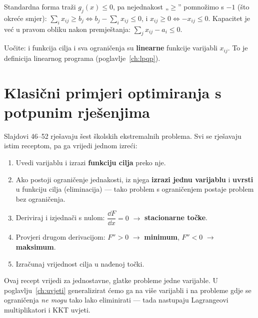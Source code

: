 \begin{napomena}
Standardna forma traži $g_j(x)\le 0$, pa nejednakost „$\ge$” pomnožimo s $-1$
(što okreće smjer): $\sum_i x_{ij} \ge b_j \Leftrightarrow
b_j - \sum_i x_{ij} \le 0$, i $x_{ij} \ge 0 \Leftrightarrow -x_{ij} \le 0$.
Kapacitet je već u pravom obliku nakon premještanja:
$\sum_j x_{ij} - a_i \le 0$.
\end{napomena}

Uočite: i funkcija cilja i sva ograničenja su \textbf{linearne} funkcije
varijabli $x_{ij}$. To je definicija linearnog programa
(poglavlje~\ref{ch:lpqp}).

\section{Klasični primjeri optimiranja s potpunim rješenjima}
\label{sec:klasicni-primjeri}

Slajdovi 46--52 rješavaju šest školskih ekstremalnih problema. Svi se rješavaju
istim receptom, pa ga vrijedi jednom izreći:

\begin{definicija}
\begin{enumerate}
  \item Uvedi varijablu i izrazi \textbf{funkciju cilja} preko nje.
  \item Ako postoji ograničenje jednakosti, iz njega \textbf{izrazi jednu
        varijablu} i \textbf{uvrsti} u funkciju cilja (eliminacija) --- tako
        problem s ograničenjem postaje problem bez ograničenja.
  \item Deriviraj i izjednači s nulom: $\dfrac{\dd F}{\dd x} = 0$ $\to$
        \textbf{stacionarne točke}.
  \item Provjeri drugom derivacijom: $F'' > 0$ $\to$ \textbf{minimum},
        $F'' < 0$ $\to$ \textbf{maksimum}.
  \item Izračunaj vrijednost cilja u nađenoj točki.
\end{enumerate}
\end{definicija}

Ovaj recept vrijedi za jednostavne, glatke probleme jedne varijable. U
poglavlju~\ref{ch:uvjeti} generalizirat ćemo ga na više varijabli i na probleme
gdje se ograničenja \emph{ne mogu} tako lako eliminirati --- tada nastupaju
Lagrangeovi multiplikatori i KKT uvjeti.

